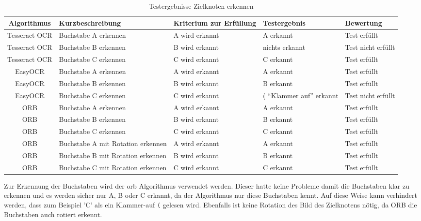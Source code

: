 \begin{table}[H]
\centering
\small
\begin{tabularx}{\textwidth}{|c|X|X|X|l|}
        \hline
        \textbf{Algorithmus} & \textbf{Kurzbeschreibung} & \textbf{Kriterium zur Erfüllung} & \textbf{Testergebnis} & \textbf{Bewertung} \\
        \hline \hline
        Tesseract OCR & Buchstabe A erkennen & A wird erkannt & A erkannt & Test erfüllt \\ \hline
        Tesseract OCR & Buchstabe B erkennen & B wird erkannt & nichts erkannt & Test nicht erfüllt \\ \hline
        Tesseract OCR & Buchstabe C erkennen & C wird erkannt &  C erkannt & Test erfüllt \\ \hline \hline
        EasyOCR & Buchstabe A erkennen & A wird erkannt & A erkannt & Test erfüllt \\ \hline
        EasyOCR & Buchstabe B erkennen & B wird erkannt & B erkannt &  Test erfüllt \\ \hline
        EasyOCR & Buchstabe C erkennen & C wird erkannt & ( \enquote{Klammer auf} erkannt & Test nicht erfüllt \\ \hline \hline
        ORB & Buchstabe A erkennen & A wird erkannt & A erkannt & Test erfüllt \\ \hline
        ORB & Buchstabe B erkennen & B wird erkannt & B erkannt & Test erfüllt \\ \hline
        ORB & Buchstabe C erkennen & C wird erkannt & C erkannt & Test erfüllt \\ \hline
        ORB & Buchstabe A mit Rotation erkennen & A wird erkannt & A erkannt & Test erfüllt \\ \hline
        ORB & Buchstabe B mit Rotation erkennen & B wird erkannt & B erkannt & Test erfüllt \\ \hline
        ORB & Buchstabe C mit Rotation erkennen & C wird erkannt & C erkannt & Test erfüllt \\ \hline

\end{tabularx}
    \caption{Testergebnisse Zielknoten erkennen}
\label{tab:test-target-node}
\end{table}

Zur Erkennung der Buchstaben wird der \acrshort{orb} Algorithmus verwendet werden. Dieser hatte keine Probleme damit die Buchstaben klar zu erkennen und es werden sicher nur A, B oder C erkannt, da der Algorithmus nur diese Buchstaben kennt. Auf diese Weise kann verhindert werden, dass zum Beispiel 'C' als ein Klammer-auf \verb|(| gelesen wird. Ebenfalls ist keine Rotation des Bild des Zielknotens nötig, da ORB die Buchstaben auch rotiert erkennt.


